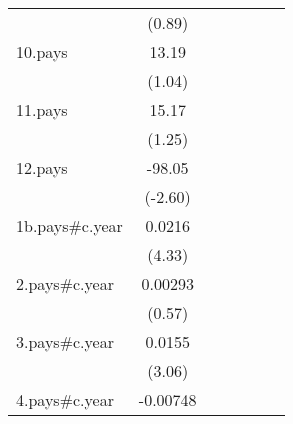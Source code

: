 {\begin{tabular}{l*{6}{c}}
                    &      (0.89)         &                     &                     &                     &                     &                     \\
[1em]
10.pays             &       13.19         &                     &                     &                     &                     &                     \\
                    &      (1.04)         &                     &                     &                     &                     &                     \\
[1em]
11.pays             &       15.17         &                     &                     &                     &                     &                     \\
                    &      (1.25)         &                     &                     &                     &                     &                     \\
[1em]
12.pays             &      -98.05\sym{**} &                     &                     &                     &                     &                     \\
                    &     (-2.60)         &                     &                     &                     &                     &                     \\
[1em]
1b.pays#c.year      &      0.0216\sym{***}&                     &                     &                     &                     &                     \\
                    &      (4.33)         &                     &                     &                     &                     &                     \\
[1em]
2.pays#c.year       &     0.00293         &                     &                     &                     &                     &                     \\
                    &      (0.57)         &                     &                     &                     &                     &                     \\
[1em]
3.pays#c.year       &      0.0155\sym{**} &                     &                     &                     &                     &                     \\
                    &      (3.06)         &                     &                     &                     &                     &                     \\
[1em]
4.pays#c.year       &    -0.00748         &                     &                     &                     &                     &                     \\

\end{tabular}}
